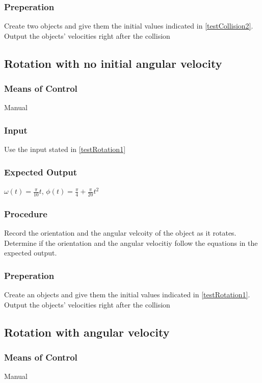\documentclass[12pt]{article}
\begin{document}
\subsubsection{Preperation}
Create two objects and give them the initial values indicated in \ref{testCollision2}.
Output the objects' velocities right after the collision


\subsection{Rotation with no initial angular velocity}
\subsubsection{Means of Control}
Manual
\subsubsection{Input}
Use the input stated in \ref{testRotation1}

\subsubsection{Expected Output}

$\omega(t) = \frac{\pi}{10}t$, 
$\phi(t) = \frac{\pi}{4} + \frac{\pi}{20}t^2$

\subsubsection{Procedure}
Record the orientation and the angular velcoity of the object as it rotates. Determine if the 
orientation and the angular velocitiy follow the equations in the expected output.  

\subsubsection{Preperation}
Create an objects and give them the initial values indicated in \ref{testRotation1}.
Output the objects' velocities right after the collision


\subsection{Rotation with angular velocity}
\subsubsection{Means of Control}
Manual
\end{document}
